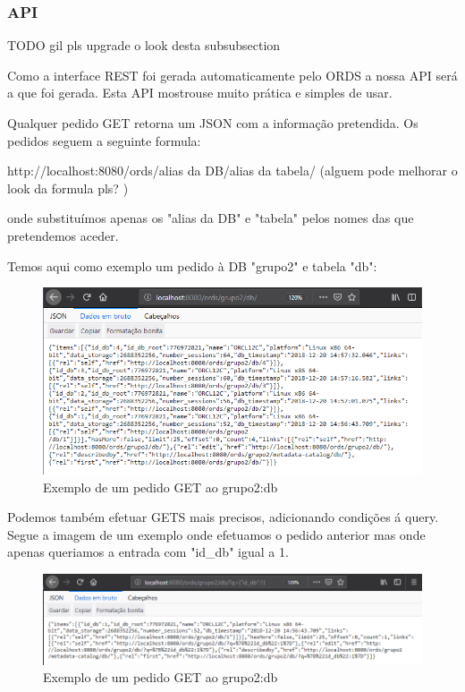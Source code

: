 \documentclass[a4paper]{article}
\begin{document}
\subsubsection{API}
\hspace{3mm} 

TODO gil pls upgrade o look desta subsubsection

Como a interface REST foi gerada automaticamente pelo ORDS a nossa API será a que foi gerada. Esta API mostrouse muito prática e simples de usar.

Qualquer pedido GET retorna um JSON com a informação pretendida.
Os pedidos seguem a seguinte formula:

http://localhost:8080/ords/{alias da DB}/{alias da tabela}/
\newline (alguem pode melhorar o look da formula pls? )

onde substituímos apenas os "alias da DB" e "tabela" pelos nomes das que pretendemos aceder.

Temos aqui como exemplo um pedido à DB "grupo2" e tabela "db":

\begin{figure}[H]
\centering
\includegraphics[scale=0.75]{REST/api_1.png}
\caption{Exemplo de um pedido GET ao grupo2:db}
\end{figure}

Podemos também efetuar GETS mais precisos, adicionando condições á query.
Segue a imagem de um exemplo onde efetuamos o pedido anterior mas onde apenas queriamos a entrada com "id\_db" igual a 1.

\begin{figure}[H]
\centering
\includegraphics[scale=0.6]{REST/api_2.png}
\caption{Exemplo de um pedido GET ao grupo2:db}
\end{figure}
\end{document}
